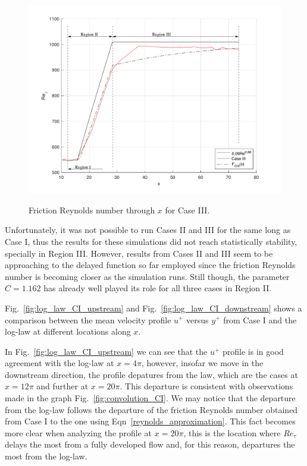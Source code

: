 \documentclass[twocolumn,10pt]{asme2e}
\begin{document}
\begin{figure}[t]
\centering
\scalebox{0.4}
{\includegraphics{convolution_CIII.pdf}}
\caption{Friction Reynolds number through \(x\) for Case III.}
\label{fig:convolution_CIII}
\end{figure}

Unfortunately, it was not possible to run Cases II and III for the same long as Case I, thus the results for these simulations did not reach statistically stability, specially in Region III. However, results from Cases II and III seem to be approaching to the delayed function so far employed since the friction Reynolds number is becoming closer as the simulation runs. Still though, the parameter \(C=1.162\) has already well played its role for all three cases in Region II.

Fig.~\ref{fig:log_law_CI_upstream} and Fig.~\ref{fig:log_law_CI_downstream} shows a comparison between the mean velocity profile \(u^+\) versus \(y^+\) from Case I and the log-law at different locations along \(x\).

In Fig.~\ref{fig:log_law_CI_upstream} we can see that the \(u^+\) profile is in good agreement with the log-law at \(x=4{\pi}\), however, insofar we move in the downstream direction, the profile depatures from the law, which are the cases at \(x=12{\pi}\) and further at \(x=20{\pi}\). This departure is consistent with observations made in the graph Fig.~\ref{fig:convolution_CI}. We may notice that the departure from the log-law follows the departure of the friction Reynolds number obtained from Case I to the one using Eqn~\ref{reynolds_approximation}. This fact becomes more clear when analyzing the profile at \(x=20{\pi}\), this is the location where \(Re_{\tau}\) delays the most from a fully developed flow and, for this reason, departures the most from the log-law.
\end{document}
